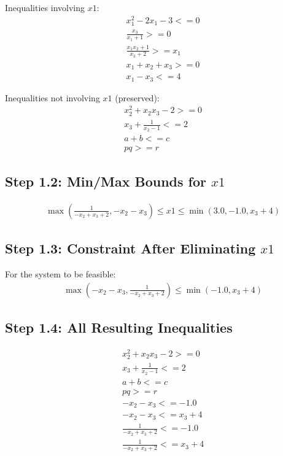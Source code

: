 \documentclass{article}
\begin{document}
Inequalities involving $x1$:
\begin{align}
& x_{1}^{2} - 2 x_{1} - 3 <= 0 \\
& \frac{x_{3}}{x_{1} + 1} >= 0 \\
& \frac{x_{1} x_{2} + 1}{x_{3} + 2} >= x_{1} \\
& x_{1} + x_{2} + x_{3} >= 0 \\
& x_{1} - x_{3} <= 4
\end{align}

Inequalities not involving $x1$ (preserved):
\begin{align}
& x_{2}^{2} + x_{2} x_{3} - 2 >= 0 \\
& x_{3} + \frac{1}{x_{2} - 1} <= 2 \\
& a + b <= c \\
& p q >= r
\end{align}

\subsection{Step 1.2: Min/Max Bounds for $x1$}

\begin{align}
& \max\left(\frac{1}{- x_{2} + x_{3} + 2}, - x_{2} - x_{3}\right) \leq x1 \leq \min\left(3.0, -1.0, x_{3} + 4\right)
\end{align}

\subsection{Step 1.3: Constraint After Eliminating $x1$}

For the system to be feasible:
\begin{align}
& \max\left(- x_{2} - x_{3}, \frac{1}{- x_{2} + x_{3} + 2}\right) \leq \min\left(-1.0, x_{3} + 4\right)
\end{align}

\subsection{Step 1.4: All Resulting Inequalities}

\begin{align}
& x_{2}^{2} + x_{2} x_{3} - 2 >= 0 \\
& x_{3} + \frac{1}{x_{2} - 1} <= 2 \\
& a + b <= c \\
& p q >= r \\
& - x_{2} - x_{3} <= -1.0 \\
& - x_{2} - x_{3} <= x_{3} + 4 \\
& \frac{1}{- x_{2} + x_{3} + 2} <= -1.0 \\
& \frac{1}{- x_{2} + x_{3} + 2} <= x_{3} + 4
\end{align}
\end{document}
